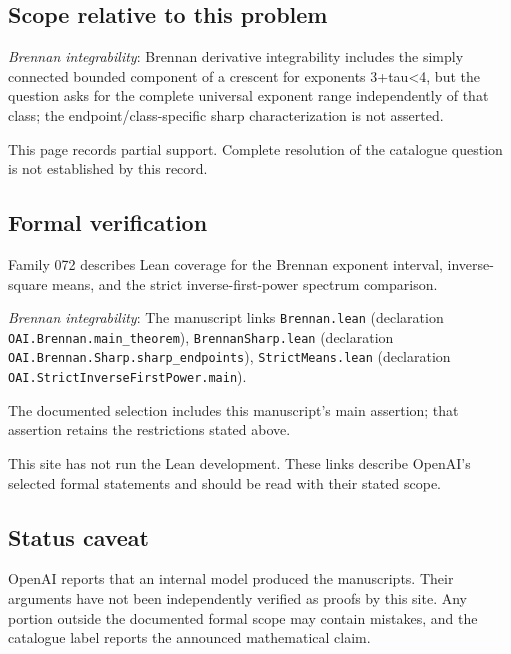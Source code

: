 \documentclass[11pt]{article}
\begin{document}
\subsection{Scope relative to this problem}
\textit{Brennan integrability}: Brennan derivative integrability includes the simply connected bounded component of a crescent for exponents 3+tau<4, but the question asks for the complete universal exponent range independently of that class; the endpoint/class-specific sharp characterization is not asserted.

This page records partial support. Complete resolution of the catalogue question is not established by this record.

\subsection{Formal verification}
Family 072 describes Lean coverage for the Brennan exponent interval, inverse-square means, and the strict inverse-first-power spectrum comparison.

\textit{Brennan integrability}: The manuscript links \texttt{Brennan.lean} (declaration \texttt{OAI.Brennan.main\_theorem}), \texttt{BrennanSharp.lean} (declaration \texttt{OAI.Brennan.Sharp.sharp\_endpoints}), \texttt{StrictMeans.lean} (declaration \texttt{OAI.StrictInverseFirstPower.main}).

The documented selection includes this manuscript’s main assertion; that assertion retains the restrictions stated above.

This site has not run the Lean development. These links describe OpenAI’s selected formal statements and should be read with their stated scope.

\subsection{Status caveat}
OpenAI reports that an internal model produced the manuscripts. Their arguments have not been independently verified as proofs by this site. Any portion outside the documented formal scope may contain mistakes, and the catalogue label reports the announced mathematical claim.
\end{document}

